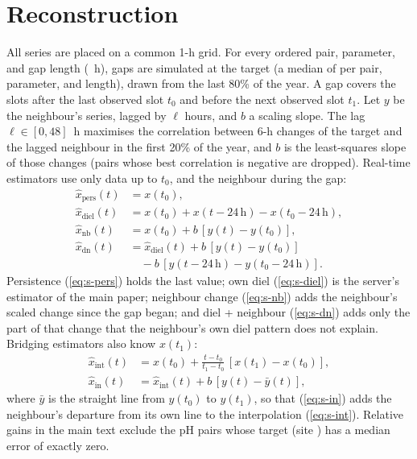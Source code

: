 \documentclass[journal]{IEEEtran}
\begin{document}
\section{Reconstruction}
\label{sec:s-reconstruct}
All series are placed on a common 1-h grid. For every ordered pair, parameter, and gap length (\chainGaps~h), gaps are simulated at the target (a median of \chainOutages{} per pair, parameter, and length), drawn from the last 80\% of the year. A gap covers the slots after the last observed slot $t_0$ and before the next observed slot $t_1$. Let $y$ be the neighbour's series, lagged by $\ell$ hours, and $b$ a scaling slope. The lag $\ell\in[0,48]$~h maximises the correlation between 6-h changes of the target and the lagged neighbour in the first 20\% of the year, and $b$ is the least-squares slope of those changes (pairs whose best correlation is negative are dropped). Real-time estimators use only data up to $t_0$, and the neighbour during the gap:
\begin{align}
\hat{x}_\mathrm{pers}(t)&=x(t_0), \label{eq:s-pers}\\
\hat{x}_\mathrm{diel}(t)&=x(t_0)+x(t-24\,\mathrm{h})-x(t_0-24\,\mathrm{h}), \label{eq:s-diel}\\
\hat{x}_\mathrm{nb}(t)&=x(t_0)+b\,[y(t)-y(t_0)], \label{eq:s-nb}\\
\hat{x}_\mathrm{dn}(t)&=\hat{x}_\mathrm{diel}(t)+b\,[y(t)-y(t_0)] \nonumber\\
&\quad-b\,[y(t-24\,\mathrm{h})-y(t_0-24\,\mathrm{h})]. \label{eq:s-dn}
\end{align}
Persistence (\ref{eq:s-pers}) holds the last value; own diel (\ref{eq:s-diel}) is the server's estimator of the main paper; neighbour change (\ref{eq:s-nb}) adds the neighbour's scaled change since the gap began; and diel + neighbour (\ref{eq:s-dn}) adds only the part of that change that the neighbour's own diel pattern does not explain. Bridging estimators also know $x(t_1)$:
\begin{align}
\hat{x}_\mathrm{int}(t)&=x(t_0)+\frac{t-t_0}{t_1-t_0}\,[x(t_1)-x(t_0)], \label{eq:s-int}\\
\hat{x}_\mathrm{in}(t)&=\hat{x}_\mathrm{int}(t)+b\,[y(t)-\bar{y}(t)], \label{eq:s-in}
\end{align}
where $\bar{y}$ is the straight line from $y(t_0)$ to $y(t_1)$, so that (\ref{eq:s-in}) adds the neighbour's departure from its own line to the interpolation (\ref{eq:s-int}). Relative gains in the main text exclude the \chainGainExcluded{} pH pairs whose target (site \chainExclSite) has a median error of exactly zero.
\end{document}
